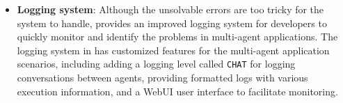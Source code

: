 \begin{itemize}
    Developers can utilize the agent's ability in \ours (e.g., memory module and message hub) to critique for semantic error checking such as self-critique, pairwise critique, and human-augmented critique.
    \item 
    \textbf{Logging system}:
    Although the unsolvable errors are too tricky for the system to handle, \ours provides an improved logging system for developers to quickly monitor and identify the problems in multi-agent applications.
    The logging system in \ours has customized features for the multi-agent application scenarios, including adding a logging level called \texttt{CHAT} for logging conversations between agents, providing formatted logs with various execution information, and a WebUI user interface to facilitate monitoring.
\end{itemize}
